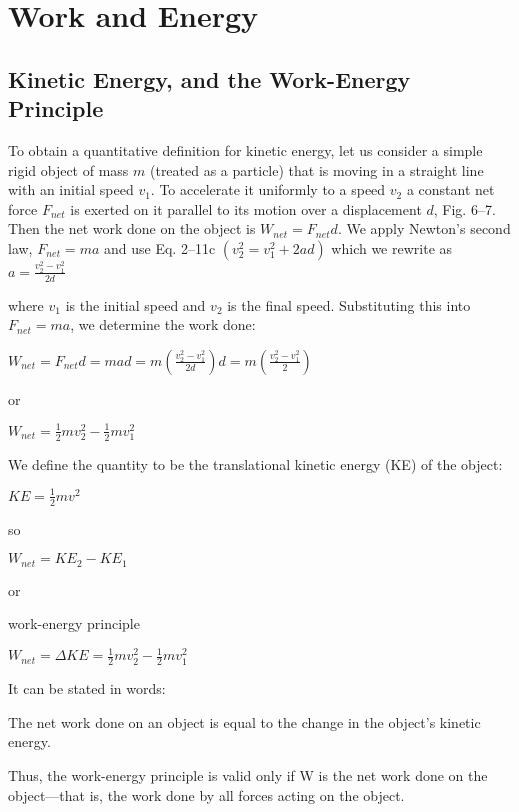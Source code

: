 \documentclass{extarticle}
\begin{document}
\markStart[100]



\section{Work and Energy}

\subsection{Kinetic Energy, and the Work-Energy Principle}

To obtain a quantitative definition for kinetic energy, let us consider a simple rigid object of mass $m$ (treated as a particle) that is moving in a straight line with an initial speed $v_1$. To accelerate it uniformly to a speed $v_2$ a constant net force $F_{net}$ is exerted on it parallel to its motion over a displacement $d$, Fig. 6–7. Then the net work done on the object is $W_{net} = F_{net}d$. We apply Newton’s second law, $F_{net} = ma$ and use Eq. 2–11c $(v_2^2 = v_1^2 + 2ad)$ which we rewrite as
$a = \frac{v_2^2 - v_1^2}{2d}$

where $v_1$ is the initial speed and $v_2$ is the final speed. Substituting this into $F_{net} = ma$, we determine the work done:

$W_{net} = F_{net}d = mad = m(\frac{v_2^2 - v_1^2}{2d})d = m(\frac{v_2^2 - v_1^2}{2})$

or

$W_{net} = \frac{1}{2}mv_2^2 - \frac{1}{2}mv_1^2$


We define the quantity
to be the translational kinetic energy (KE) of the object:

$KE = \frac{1}{2}mv^2$

so 

$W_{net} = {KE}_2 - {KE}_1$

or 

work-energy principle

$W_{net} = \Delta KE = \frac{1}{2}mv_2^2 - \frac{1}{2}mv_1^2$

It can be stated in words:

The net work done on an object is equal to the change in the object’s
kinetic energy.


Thus, the work-energy principle is valid only if W is the net work done on the object—that is, the work done by all forces acting on the object.





\markEnd
\end{document}
